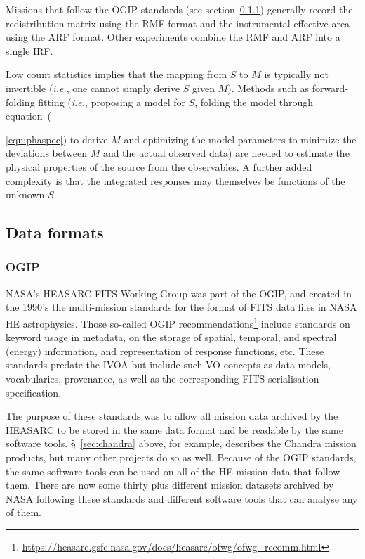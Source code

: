 \documentclass[11pt,a4paper]{ivoa}
\begin{document}
Missions that follow the OGIP standards (see section~\ref{sec:ogip}) generally record the redistribution matrix using the \gls{RMF} format and the instrumental effective area using the \gls{ARF} format.  Other experiments combine the \gls{RMF} and \gls{ARF} into a single \gls{IRF}.

Low count statistics implies that the mapping from $S$ to $M$ is typically not invertible ({\em i.e.\/}, one cannot simply derive $S$ given $M$)\null.  Methods such as forward-folding fitting \citep{mattox:1996} ({\em i.e.\/}, proposing a model for $S$, folding the model through equation~({\ref{eqn:phaspec}) to derive $M$ and optimizing the model parameters to minimize the deviations between $M$ and the actual observed data) are needed to estimate the physical properties of the source from the observables.  A further added complexity is that the integrated responses may themselves be functions of the unknown $S$.

\subsection{Data formats}
\label{sec:data_formats}

\subsubsection{OGIP}\label{sec:ogip}

\gls{NASA}'s \gls{HEASARC} \gls{FITS} Working Group was part of the \gls{OGIP}, and created in the 1990's the multi-mission standards for the format of \gls{FITS} data files in \gls{NASA} \gls{HE} astrophysics. Those so-called \gls{OGIP} recommendations\footnote{\url{https://heasarc.gsfc.nasa.gov/docs/heasarc/ofwg/ofwg_recomm.html}} include standards on keyword usage in metadata, on the storage of spatial, temporal, and spectral (energy) information, and representation of response functions, etc.  These standards predate the \gls{IVOA} but include such \gls{VO} concepts as data models, vocabularies, provenance, as well as the corresponding \gls{FITS} serialisation specification.

The purpose of these standards was to allow all mission data archived by the \gls{HEASARC} to be stored in the same data format
and be readable by the same software tools. \S~\ref{sec:chandra} above, for example, describes the Chandra mission products,
but many other projects do so as well. Because of the \gls{OGIP} standards, the same software tools can be used on all of the \gls{HE}
mission data that follow them. There are now some thirty plus different mission datasets archived by \gls{NASA} following
these standards and different software tools that can analyse any of them.

}
\end{document}
